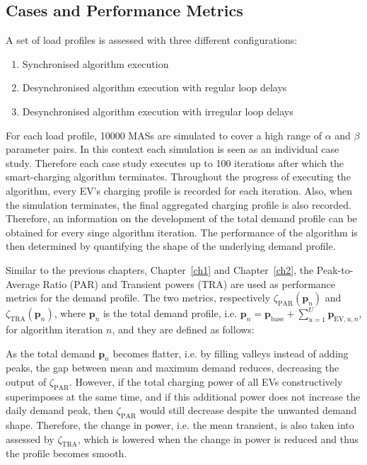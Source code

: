 \subsection{Cases and Performance Metrics}
\label{ch3:subsec:cases-and-metrics}

A set of load profiles is assessed with three different configurations:

\begin{enumerate}
	\item Synchronised algorithm execution
	\item Desynchronised algorithm execution with regular loop delays
	\item Desynchronised algorithm execution with irregular loop delays
\end{enumerate}

For each load profile, 10000 MASs are simulated to cover a high range of $\alpha$ and $\beta$ parameter pairs.
In this context each simulation is seen as an individual case study.
Therefore each case study executes up to 100 iterations after which the smart-charging algorithm terminates.
Throughout the progress of executing the algorithm, every EV's charging profile is recorded for each iteration.
Also, when the simulation terminates, the final aggregated charging profile is also recorded.
Therefore, an information on the development of the total demand profile can be obtained for every singe algorithm iteration.
The performance of the algorithm is then determined by quantifying the shape of the underlying demand profile.

Similar to the previous chapters, Chapter~\ref{ch1} and Chapter~\ref{ch2}, the Peak-to-Average Ratio (PAR) and Transient powers (TRA) are used as performance metrics for the demand profile.
The two metrics, respectively $\zeta_\text{PAR}(\textbf{p}_n)$ and $\zeta_\text{TRA}(\textbf{p}_n)$, where $\textbf{p}_n$ is the total demand profile, i.e. $\textbf{p}_n = \textbf{p}_\text{base} + \sum_{u=1}^U \textbf{p}_{\text{EV},u,n}$, for algorithm iteration $n$, and they are defined as follows:



As the total demand $\textbf{p}_n$ becomes flatter, i.e. by filling valleys instead of adding peaks, the gap between mean and maximum demand reduces, decreasing the output of $\zeta_\text{PAR}$.
However, if the total charging power of all EVs constructively superimposes at the same time, and if this additional power does not increase the daily demand peak, then $\zeta_\text{PAR}$ would still decrease despite the unwanted demand shape.
Therefore, the change in power, i.e. the mean transient, is also taken into assessed by $\zeta_\text{TRA}$, which is lowered when the change in power is reduced and thus the profile becomes smooth.

